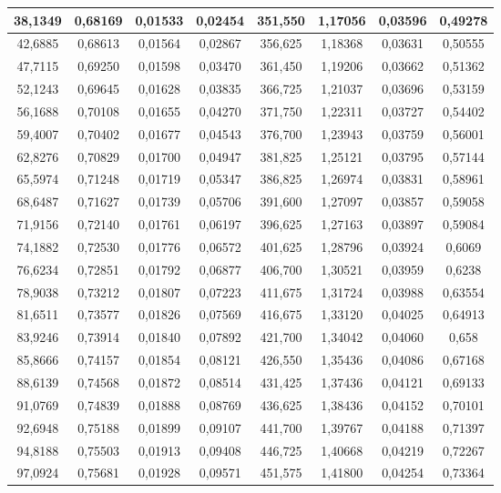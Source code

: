 \documentclass[a4paper,12pt]{article}
\numberwithin{equation}{section}
\begin{document}
\begin{appendices}
\begin{longtable}[c]{|c|c|c|c|c|c|c|c|}
38,1349	&	0,68169	&	0,01533	&	0,02454	&	351,550	&	1,17056	&	0,03596	&	0,49278	\\\hline
42,6885	&	0,68613	&	0,01564	&	0,02867	&	356,625	&	1,18368	&	0,03631	&	0,50555	\\\hline
47,7115	&	0,69250	&	0,01598	&	0,03470	&	361,450	&	1,19206	&	0,03662	&	0,51362	\\\hline
52,1243	&	0,69645	&	0,01628	&	0,03835	&	366,725	&	1,21037	&	0,03696	&	0,53159	\\\hline
56,1688	&	0,70108	&	0,01655	&	0,04270	&	371,750	&	1,22311	&	0,03727	&	0,54402	\\\hline
59,4007	&	0,70402	&	0,01677	&	0,04543	&	376,700	&	1,23943	&	0,03759	&	0,56001	\\\hline
62,8276	&	0,70829	&	0,01700	&	0,04947	&	381,825	&	1,25121	&	0,03795	&	0,57144	\\\hline
65,5974	&	0,71248	&	0,01719	&	0,05347	&	386,825	&	1,26974	&	0,03831	&	0,58961	\\\hline
68,6487	&	0,71627	&	0,01739	&	0,05706	&	391,600	&	1,27097	&	0,03857	&	0,59058	\\\hline
71,9156	&	0,72140	&	0,01761	&	0,06197	&	396,625	&	1,27163	&	0,03897	&	0,59084	\\\hline
74,1882	&	0,72530	&	0,01776	&	0,06572	&	401,625	&	1,28796	&	0,03924	&	0,6069	\\\hline
76,6234	&	0,72851	&	0,01792	&	0,06877	&	406,700	&	1,30521	&	0,03959	&	0,6238	\\\hline
78,9038	&	0,73212	&	0,01807	&	0,07223	&	411,675	&	1,31724	&	0,03988	&	0,63554	\\\hline
81,6511	&	0,73577	&	0,01826	&	0,07569	&	416,675	&	1,33120	&	0,04025	&	0,64913	\\\hline
83,9246	&	0,73914	&	0,01840	&	0,07892	&	421,700	&	1,34042	&	0,04060	&	0,658	\\\hline
85,8666	&	0,74157	&	0,01854	&	0,08121	&	426,550	&	1,35436	&	0,04086	&	0,67168	\\\hline
88,6139	&	0,74568	&	0,01872	&	0,08514	&	431,425	&	1,37436	&	0,04121	&	0,69133	\\\hline
91,0769	&	0,74839	&	0,01888	&	0,08769	&	436,625	&	1,38436	&	0,04152	&	0,70101	\\\hline
92,6948	&	0,75188	&	0,01899	&	0,09107	&	441,700	&	1,39767	&	0,04188	&	0,71397	\\\hline
94,8188	&	0,75503	&	0,01913	&	0,09408	&	446,725	&	1,40668	&	0,04219	&	0,72267	\\\hline
97,0924	&	0,75681	&	0,01928	&	0,09571	&	451,575	&	1,41800	&	0,04254	&	0,73364	\\\hline

\end{longtable}
\end{appendices}
\end{document}
